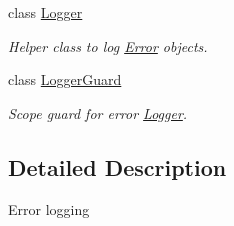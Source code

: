 \begin{DoxyCompactItemize}
class \hyperlink{class_mdt_1_1_error_logger_1_1_logger}{Logger}
\begin{DoxyCompactList}\small\item\em Helper class to log \hyperlink{class_mdt_1_1_error}{Error} objects. \end{DoxyCompactList}\item 
class \hyperlink{class_mdt_1_1_error_logger_1_1_logger_guard}{Logger\+Guard}
\begin{DoxyCompactList}\small\item\em Scope guard for error \hyperlink{class_mdt_1_1_error_logger_1_1_logger}{Logger}. \end{DoxyCompactList}\end{DoxyCompactItemize}


\subsection{Detailed Description}
Error logging 